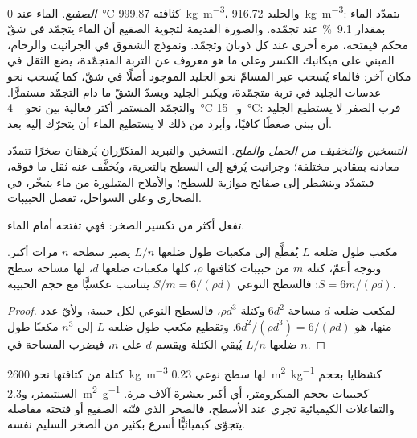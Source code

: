 \emph{الصقيع.} الماء عند \qty{0}{\celsius} كثافته \qty{999.87}{kg.m^{-3}}، والجليد \qty{916.72}{kg.m^{-3}}: يتمدّد الماء بمقدار \qty{9.1}{\percent} عند تجمّده. والصورة القديمة لتجوية الصقيع أن الماء يتجمّد في شقّ محكم فيفتحه، مرة أخرى عند كل ذوبان وتجمّد. ونموذج الشقوق في الجرانيت والرخام، المبني على ميكانيك الكسر وعلى ما هو معروف عن التربة المتجمّدة، يضع الثقل في مكان آخر: فالماء يُسحب عبر المسامّ نحو الجليد الموجود أصلًا في شقّ، كما يُسحب نحو عدسات الجليد في تربة متجمّدة، ويكبر الجليد ويسدّ الشقّ ما دام التجمّد مستمرًّا. والتجمّد المستمر أكثر فعالية بين نحو \qty{-4}{\celsius} و\qty{-15}{\celsius}: قرب الصفر لا يستطيع الجليد أن يبني ضغطًا كافيًا، وأبرد من ذلك لا يستطيع الماء أن يتحرّك إليه بعد.

\emph{التسخين والتخفيف من الحمل والملح.} التسخين والتبريد المتكرّران يُرهقان صخرًا تتمدّد معادنه بمقادير مختلفة؛ وجرانيت يُرفع إلى السطح بالتعرية، ويُخفَّف عنه ثقل ما فوقه، فيتمدّد وينشطر إلى صفائح موازية للسطح؛ والأملاح المتبلورة من ماء يتبخّر، في الصحارى وعلى السواحل، تفصل الحبيبات.

 تفعل أكثر من تكسير الصخر: فهي تفتحه أمام الماء.

\begin{proposition}\label{prop:b1:weathering-clays:surface}
مكعب طول ضلعه $L$ يُقطَّع إلى مكعبات طول ضلعها $L/n$ يصير سطحه $n$ مرات أكبر. وبوجه أعمّ، كتلة $m$ من حبيبات كثافتها $\rho$، كلها مكعبات ضلعها $d$، لها مساحة سطح $S = 6m/(\rho d)$: فالسطح النوعي $S/m =
6/(\rho d)$ يتناسب عكسيًّا مع حجم الحبيبة.
\end{proposition}

\begin{proof}
لمكعب ضلعه $d$ مساحة $6d^2$ وكتلة $\rho d^3$، فالسطح النوعي لكل حبيبة، ولأيّ عدد منها، هو $6d^2/(\rho d^3)
= 6/(\rho d)$. وتقطيع مكعب طول ضلعه $L$ إلى $n^3$ مكعبًا طول ضلعها $L/n$ يُبقي الكتلة ويقسم $d$ على $n$، فيضرب المساحة في $n$.
\end{proof}

كتلة من  كثافتها نحو \qty{2600}{kg.m^{-3}} لها سطح نوعي \qty{0.23}{m^2.kg^{-1}} كشظايا بحجم السنتيمتر، و\qty{2.3}{m^2.g^{-1}} كحبيبات بحجم الميكرومتر، أي أكبر بعشرة آلاف مرة. والتفاعلات الكيميائية تجري عند الأسطح، فالصخر الذي فتّته الصقيع أو فتحته مفاصله يتجوّى كيميائيًّا أسرع بكثير من الصخر السليم نفسه.

